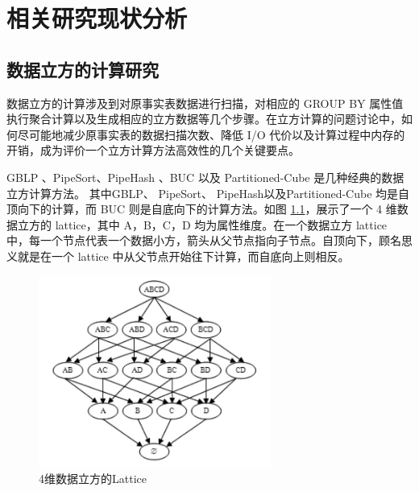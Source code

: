 \chapter{相关研究现状分析}


\section{数据立方的计算研究}

数据立方的计算涉及到对原事实表数据进行扫描，对相应的 GROUP BY 属性值执行聚合计算以及生成相应的立方数据等几个步骤。在立方计算的问题讨论中，如何尽可能地减少原事实表的数据扫描次数、降低 I/O 代价以及计算过程中内存的开销，成为评价一个立方计算方法高效性的几个关键要点。

GBLP \cite{gray1997data}、PipeSort、PipeHash \cite{agarwal1996computation}、BUC \cite{beyer1999bottom} 以及 Partitioned-Cube \cite{ross1997fast} 是几种经典的数据立方计算方法。 其中GBLP、 PipeSort、 PipeHash以及Partitioned-Cube 均是自顶向下的计算，而 BUC 则是自底向下的计算方法。如图 \ref{4_dimension_lattice}，展示了一个 4 维数据立方的 lattice，其中 A，B，C，D 均为属性维度。在一个数据立方 lattice 中，每一个节点代表一个数据小方，箭头从父节点指向子节点。自顶向下，顾名思义就是在一个 lattice 中从父节点开始往下计算，而自底向上则相反。

\begin{figure}[!htb]
\centering\includegraphics[width=3in]{picture/ch_current_research/4_dimension_lattice} 
\caption{4维数据立方的Lattice}\label{4_dimension_lattice} 
\end{figure} 

